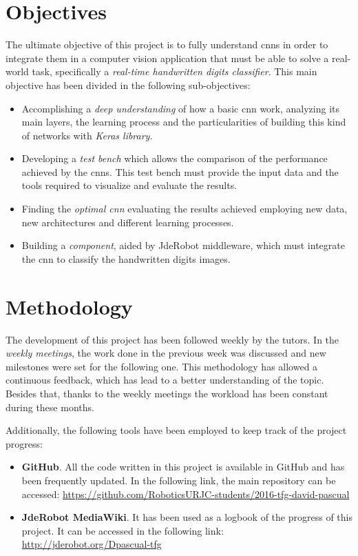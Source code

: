 \section{Objectives}\label{sec:objectives}
The ultimate objective of this project is to fully understand \glspl{cnn} in order to integrate them in a computer vision application that must be able to solve a real-world task, specifically a \emph{real-time handwritten digits classifier}. This main objective has been divided in the following sub-objectives: 
\begin{itemize}
	\item Accomplishing a \emph{deep understanding} of how a basic \gls{cnn} work, analyzing its main layers, the learning process and the particularities of building this kind of networks with \emph{Keras library}.
	\item Developing a \emph{test bench} which allows the comparison of the performance achieved by the \glspl{cnn}. This test bench must provide the input data and the tools required to visualize and evaluate the results.
	\item Finding the \emph{optimal \gls{cnn}} evaluating the results achieved employing new data, new architectures and different learning processes.
	\item Building a \emph{component}, aided by JdeRobot middleware, which must integrate the \gls{cnn} to classify the handwritten digits images.
\end{itemize}

\section{Methodology}
The development of this project has been followed weekly by the tutors. In the \emph{weekly meetings}, the work done in the previous week was discussed and new milestones were set for the following one. This methodology has allowed a continuous feedback, which has lead to a better understanding of the topic. Besides that, thanks to the weekly meetings the workload has been constant during these months. 

Additionally, the following tools have been employed to keep track of the project progress:
\begin{itemize}
	\item \textbf{GitHub}. All the code written in this project is available in GitHub and has been  frequently updated. In the following link, the main repository can be accessed:
	\url{https://github.com/RoboticsURJC-students/2016-tfg-david-pascual}
	\item \textbf{JdeRobot MediaWiki}. It has been used as a logbook of the progress of this project. It can be accessed in the following link:
	\url{http://jderobot.org/Dpascual-tfg}
\end{itemize}

